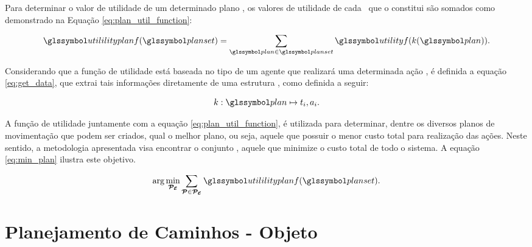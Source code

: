 Para determinar o valor de utilidade de um determinado plano , os valores de utilidade de cada \ que o constitui são somados como demonstrado na Equação \ref{eq:plan_util_function}:

\begin{equation}
  \sy{utililityplanf}(\sy{planset}) = \displaystyle\sum_{\sy{plan} \in \sy{planset}} \sy{utilityf}(k(\sy{plan})).
  \label{eq:plan_util_function}
\end{equation}

Considerando que a função de utilidade está baseada no tipo  de um agente que realizará uma determinada ação \movementaction, é definida a equação \ref{eq:get_data}, que extrai tais informações diretamente de uma estrutura , como definida a seguir:

\begin{equation}
  k : \sy{plan} \mapsto \type{i}, \movementaction.
  \label{eq:get_data}
\end{equation}

A função de utilidade  juntamente com a equação \ref{eq:plan_util_function}, é utilizada para determinar, dentre os diversos planos de movimentação que podem ser criados, qual o melhor plano, ou seja, aquele que possuir o menor custo total para realização das ações.
Neste sentido, a metodologia apresentada visa encontrar o conjunto , aquele que minimize o custo total de todo o sistema.
A equação \ref{eq:min_plan} ilustra este objetivo.

\begin{equation}
  \arg\min_{\executionplanset} \sum_{\substack{\planset \in \executionplanset}} \sy{utililityplanf}(\sy{planset}).
  \label{eq:min_plan}
\end{equation}



\section{Planejamento de Caminhos - Objeto} %
\label{sub:planejamento_de_caminhos_objeto}

